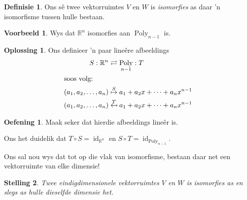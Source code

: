 \documentclass[a4paper,11pt]{book}
\newtheorem{theorem}{Stelling}
\theoremstyle{definition}
\newtheorem{definition}[theorem]{Definisie}
\newtheorem{exercise}{Oefening}
\newtheorem{example_environment}{Voorbeeld}[chapter]
\newtheorem*{solution}{Oplossing}
\newenvironment{example}
	{
		\begin{oframed}
		\begin{example_environment}
	}
	{
		\end{example_environment}
		\end{oframed}
	}
\DeclareMathOperator{\Poly}{Poly}
\DeclareMathOperator{\id}{id}
\begin{document}
\begin{definition} Ons s{\^e} twee vektorruimtes $V$ en $W$ is
	\emph{isomorfies} as daar 'n isomorfisme tussen hulle bestaan.
\end{definition}

\begin{example} Wys dat $\mathbb{R}^n$ isomorfies aan $\Poly_{n-1}$ is.
	\begin{solution} Ons definieer 'n paar line{\^e}re afbeeldings
		\begin{align*}
			S : \mathbb{R}^n & \rightleftarrows \Poly_{n-1} : T \\
			\intertext{soos volg:}
			(a_1, a_2, \ldots, a_n) & \stackrel{S}{\mapsto} a_1 + a_2 x +
			\cdots + a_n x^{n-1} \\
			(a_1, a_2, \ldots, a_n) & \stackrel{T}{\mapsfrom} a_1 + a_2 x +
			\cdots + a_n x^{n-1} 
		\end{align*}
	\end{solution}
	\begin{exercise} Maak seker dat hierdie afbeeldings line{\^e}r is.
	\end{exercise}
	Ons het duidelik dat $T \circ S = \id_{\mathbb{R}^n}$ en $S \circ T =
	\id_{\Poly_{n-1}}$.
\end{example}
Ons sal nou wys dat tot op die vlak van isomorfisme, bestaan daar net een
vektorruimte van elke dimensie!
\begin{theorem} Twee eindigdimensionele vektorruimtes $V$ en $W$ is
	isomorfies as en slegs as hulle dieselfde dimensie het.
\end{theorem}
\end{document}
